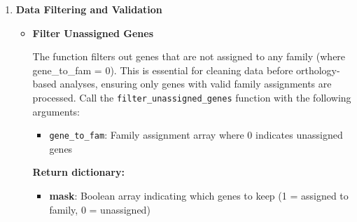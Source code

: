 \documentclass[11pt]{article}
\begin{document}
\begin{enumerate}
\begin{itemize}
	      	      \begin{lstlisting}[language=Python, caption={Python Read OrthoFinder File}]
family_result = read_orthofinder_file(filename, gene_ids, 
                                family_ids_len, n_families)
	      	      \end{lstlisting}
	      	      
	      	      \textbf{Complete Data Loading Workflow Example:} \begin{lstlisting}[language=Python, caption={Python Complete Data Loading Workflow}]
# Step 1: Load gene identifiers
gene_ids = read_gene_ids_from_tsv_file(
	filename="data/expression_data.tsv",
	n_genes=50000,
	gene_ids_len=32,
	n_header_rows=1,
	gene_col=1
)

# Step 2: Load expression data from multiple samples
samples = ["sample1.tsv", "sample2.tsv", "sample3.tsv", "sample4.tsv"]
expression_vectors = read_expression_vectors(
	file_list=samples,
	gene_ids=gene_ids,
	n_samples=12, # assuming 3 samples per file
	n_header_rows=1,
	gene_col=1,
	value_cols=[2, 3]
)

# Step 3: Load orthology information
orthology_data = read_orthofinder_file(
	filename="data/Orthogroups.tsv",
	gene_ids=gene_ids,
	family_ids_len=32,
	n_families=15000
)
	      	\end{lstlisting}
	      \end{itemize}
	      
	\item \textbf{Data Filtering and Validation}
	      \begin{itemize}
	      	\item \textbf{Filter Unassigned Genes}
	      	      
	      	      The function filters out genes that are not assigned to any family (where
	      	      gene\_to\_fam = 0). This is essential for cleaning data before
	      	      orthology-based analyses, ensuring only genes with valid family assignments
	      	      are processed. Call the \texttt{filter\_unassigned\_genes} function with
	      	      the following arguments:
	      	      
	      	      \begin{itemize}
	      	      	\item \texttt{gene\_to\_fam}: Family assignment array where 0 indicates
	      	      	      unassigned genes
	      	      \end{itemize}
	      	      
	      	      \textbf{Return dictionary:}
	      	      \begin{itemize}
	      	      	\item \textbf{mask}: Boolean array indicating which genes to keep (1
	      	      	      = assigned to family, 0 = unassigned)
	      	      	      

\end{itemize}
\end{itemize}
\end{enumerate}
\end{document}
